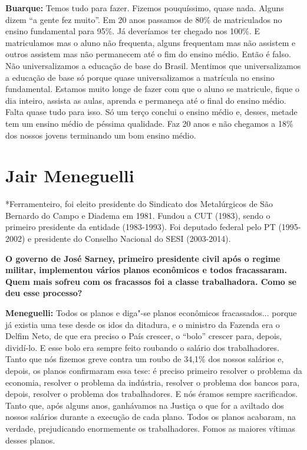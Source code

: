 \textbf{Buarque:} Temos tudo para fazer. Fizemos pouquíssimo, quase
nada. Alguns dizem ``a gente fez muito''. Em 20 anos passamos de 80\% de
matriculados no ensino fundamental para 95\%. Já deveríamos ter chegado
nos 100\%. E matriculamos mas o aluno não frequenta, alguns frequentam
mas não assistem e outros assistem mas não permanecem até o fim do
ensino médio. Então é falso. Não universalizamos a educação de base do
Brasil. Mentimos que universalizamos a educação de base só porque quase
universalizamos a matrícula no ensino fundamental. Estamos muito longe
de fazer com que o aluno se matricule, fique o dia inteiro, assista as
aulas, aprenda e permaneça até o final do ensino médio. Falta quase tudo
para isso. Só um terço conclui o ensino médio e, desses, metade tem um
ensino médio de péssima qualidade. Faz 20 anos e não chegamos a 18\% dos
nossos jovens terminando um bom ensino médio.

\section{Jair Meneguelli}

*Ferramenteiro, foi eleito presidente do Sindicato dos Metalúrgicos de
São Bernardo do Campo e Diadema em 1981. Fundou a CUT (1983), sendo o
primeiro presidente da entidade (1983-1993). Foi deputado federal pelo
PT (1995-2002) e presidente do Conselho Nacional do SESI (2003-2014).

\textbf{O governo de José Sarney, primeiro presidente civil após o
regime militar, implementou vários planos econômicos e todos
fracassaram. Quem mais sofreu com os fracassos foi a classe
trabalhadora. Como se deu esse processo?}

\textbf{Meneguelli:} Todos os planos e diga"-se planos econômicos
fracassados... porque já existia uma tese desde os idos da ditadura, e o
ministro da Fazenda era o Delfim Neto, de que era preciso o País
crescer, o ``bolo'' crescer para, depois, dividí-lo. E esse bolo era
sempre feito roubando o salário dos trabalhadores. Tanto que nós fizemos
greve contra um roubo de 34,1\% dos nossos salários e, depois, os planos
confirmaram essa tese: é preciso primeiro resolver o problema da
economia, resolver o problema da indústria, resolver o problema dos
bancos para, depois, resolver o problema dos trabalhadores. E nós éramos
sempre sacrificados. Tanto que, após alguns anos, ganhávamos na Justiça
o que for a aviltado dos nossos salários durante a execução de cada
plano. Todos os planos acabaram, na verdade, prejudicando enormemente os
trabalhadores. Fomos as maiores vítimas desses planos.

